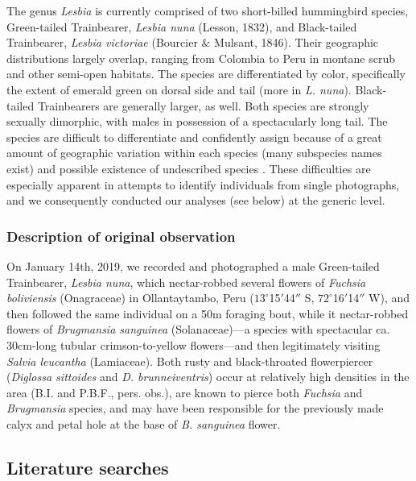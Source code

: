 \documentclass[fleqn,10pt,lineno]{wlpeerj}
\begin{document}
The genus \textit{Lesbia} is currently comprised of two short-billed hummingbird species, Green-tailed Trainbearer, \textit{Lesbia nuna} (Lesson, 1832), and Black-tailed Trainbearer, \textit{Lesbia victoriae} (Bourcier \& Mulsant, 1846). 
Their geographic distributions largely overlap, ranging from Colombia to Peru in montane scrub and other semi-open habitats. 
The species are differentiated by color, specifically the extent of emerald green on dorsal side and tail (more in \textit{L. nuna}). 
Black-tailed Trainbearers are generally larger, as well. 
Both species are strongly sexually dimorphic, with males in possession of a spectacularly long tail.
The species are difficult to differentiate and confidently assign because of a great amount of geographic variation within each species (many subspecies names exist) and possible existence of undescribed species \citep{weller2004,stiles2004}. %
These difficulties are especially apparent in attempts to identify individuals from single photographs, and we consequently conducted our analyses (see below) at the generic level.

\subsubsection*{Description of original observation} %

On January 14th, 2019, we recorded and photographed a male Green-tailed Trainbearer, \textit{Lesbia nuna}, which nectar-robbed several flowers of \textit{Fuchsia boliviensis} (Onagraceae) in Ollantaytambo, Peru ($13^{\circ}$15$'$44$''$ S, $72^{\circ}$16$'$14$''$ W), and then followed the same individual on a 50m foraging bout, while it nectar-robbed flowers of \textit{Brugmansia sanguinea} (Solanaceae)---a species with spectacular ca. 30cm-long tubular crimson-to-yellow flowers---and then legitimately visiting \textit{Salvia leucantha} (Lamiaceae). Both rusty and black-throated flowerpiercer (\textit{Diglossa sittoides} and \textit{D. brunneiventris}) occur at relatively high densities in the area (B.I. and P.B.F., pers. obs.), are known to pierce both \textit{Fuchsia} and \textit{Brugmansia} species, and may have been responsible for the previously made calyx and petal hole at the base of \textit{B. sanguinea} flower.

\subsection*{Literature searches}
\end{document}

